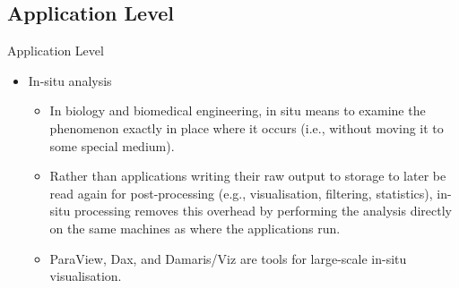 \documentclass[compress,11pt,xcolor=svgnames,aspectratio=169]{beamer}
\begin{document}
\subsection{Application Level}

\begin{frame}[fragile]{Application Level}

\begin{itemize}

\item In-situ analysis\\[0.4cm]

    \begin{itemize}
    \setlength\itemsep{0.6cm}

    \item In biology and biomedical engineering, in situ means to examine the phenomenon exactly in place where it occurs (i.e., without moving it to some special medium).

    \item Rather than applications writing their raw output to storage to later be read again for post-processing (e.g., visualisation, filtering, statistics), in-situ processing removes this overhead by performing the analysis directly on the same machines as where the applications run.

    \item ParaView, Dax, and Damaris/Viz are tools for large-scale in-situ visualisation.

    \end{itemize}

\end{itemize}

\nocite{3372390}

\end{frame}
\end{document}
